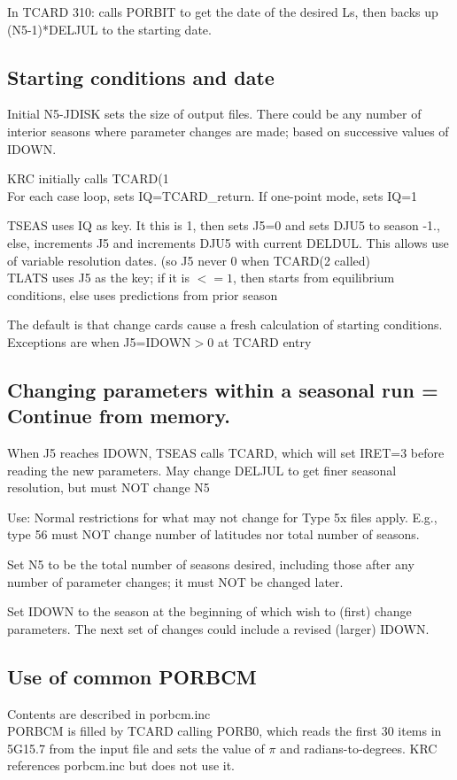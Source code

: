 \documentclass[draft]{article}  %
\begin{document}
In TCARD 310: calls PORBIT to get the date of the desired Ls, then backs up
(N5-1)*DELJUL to the starting date.

\subsection{Starting conditions and date}%

Initial N5-JDISK sets the size of output files. There could be any number of
interior seasons where parameter changes are made; based on successive values of
IDOWN.

KRC initially calls TCARD(1  \\
For each case loop, sets IQ=TCARD\_return. If one-point mode, sets IQ=1

TSEAS uses IQ as key. It this is 1, then sets J5=0 and sets DJU5 to season -1.,
else, increments J5 and increments DJU5 with current DELDUL. This allows use of
variable resolution dates. (so J5 never 0 when TCARD(2 called) \\

TLATS uses J5 as the key; if it is $<= 1$, then starts from equilibrium
conditions, else uses predictions from prior season

The default is that change cards cause a fresh calculation of starting
conditions. Exceptions are when J5=IDOWN$>0$ at TCARD entry

\subsection{Changing parameters within a seasonal run = Continue from memory.}%

When J5 reaches IDOWN, TSEAS calls TCARD, which will set IRET=3 before reading
the new parameters. May change DELJUL to get finer seasonal resolution, but must
NOT change N5

Use: Normal restrictions for what may not change for Type 5x files apply.
E.g., type 56 must NOT change number of latitudes nor total number of seasons.

Set N5 to be the total number of seasons desired, including those
after any number of parameter changes; it must NOT be changed later.

Set IDOWN to the season at the beginning of which wish to (first) change
parameters. The next set of changes could include a revised (larger) IDOWN.


\subsection{Use of common PORBCM}%
Contents are described in porbcm.inc \\
PORBCM is filled by TCARD calling PORB0, which reads the first 30 items in 
5G15.7 from the input file and sets the value of $\pi$ and radians-to-degrees. 
KRC references porbcm.inc but does not use it.
\end{document}
